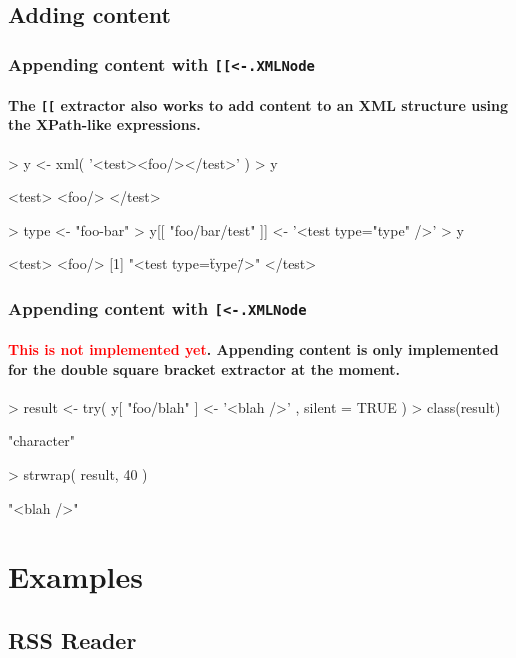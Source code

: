 \documentclass[smaller]{beamer}
\begin{document}
\subsection{Adding content}

\begin{frame}[fragile]
 \frametitle{Appending content with \texttt{[[<-.XMLNode}}
 \framesubtitle{The \texttt{[[} extractor also works to add content to an XML structure using the XPath-like expressions.}
\begin{Schunk}
\begin{Sinput}
> y <- xml( '<test><foo/></test>' )
> y
\end{Sinput}
\begin{Soutput}
<test>
 <foo/>
</test>
\end{Soutput}
\begin{Sinput}
> type <- "foo-bar"
> y[[ "foo/bar/test" ]] <- '<test type="{type}" />'
> y
\end{Sinput}
\begin{Soutput}
<test>
 <foo/>
[1] "<test type=\"{type}\" />"
</test>
\end{Soutput}
\end{Schunk}
\end{frame}

\begin{frame}[fragile]
 \frametitle{Appending content with \texttt{[<-.XMLNode}}
\framesubtitle{\textcolor{red}{This is not implemented yet}. Appending content is only implemented for the double square bracket extractor at the moment. } 
\begin{Schunk}
\begin{Sinput}
> result <- try( 
    y[ "foo/blah" ] <- '<blah />' ,  silent = TRUE )
> class(result)
\end{Sinput}
\begin{Soutput}
[1] "character"
\end{Soutput}
\begin{Sinput}
> strwrap( result, 40 )
\end{Sinput}
\begin{Soutput}
[1] "<blah />"
\end{Soutput}
\end{Schunk}
\end{frame}

\section{Examples}

\subsection{RSS Reader}
\end{document}
